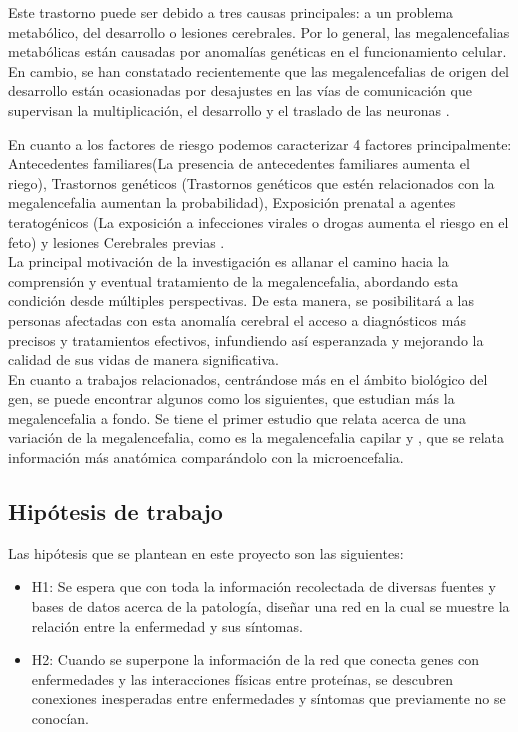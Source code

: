 Este trastorno puede ser debido a tres causas principales: a un problema metabólico, del desarrollo o lesiones cerebrales. Por lo general, las megalencefalias metabólicas están causadas por anomalías genéticas en el funcionamiento celular. En cambio, se han constatado recientemente que las megalencefalias de origen del desarrollo están ocasionadas por desajustes en las vías de comunicación que supervisan la multiplicación, el desarrollo y el traslado de las neuronas \cite{winden_megalencephaly_2015}.

En cuanto a los factores de riesgo podemos caracterizar 4 factores principalmente: Antecedentes familiares(La presencia de antecedentes familiares aumenta el riego), Trastornos genéticos (Trastornos genéticos que estén relacionados con la megalencefalia aumentan la probabilidad), Exposición prenatal a agentes teratogénicos (La exposición a infecciones virales o drogas aumenta el riesgo en el feto) y lesiones Cerebrales previas \cite{winden_megalencephaly_2015}. \\


La principal motivación de la investigación es allanar el camino hacia la comprensión y eventual tratamiento de la megalencefalia, abordando esta condición desde múltiples perspectivas. De esta manera, se posibilitará a las personas afectadas con esta anomalía cerebral el acceso a diagnósticos más precisos y tratamientos efectivos, infundiendo así esperanzada y mejorando la calidad de sus vidas de manera significativa.\\


En cuanto a trabajos relacionados, centrándose más en el ámbito biológico del gen, se puede encontrar algunos como los siguientes, que estudian más la megalencefalia a fondo. Se tiene el primer estudio que relata acerca de una variación de la megalencefalia, como es la megalencefalia capilar \cite{mirzaa_megalencephaly-capillary_2012} y \cite{pirozzi_microcephaly_2018}, que se relata información más anatómica comparándolo con la microencefalia. 


\subsection{Hipótesis de trabajo}

Las hipótesis que se plantean en este proyecto son las siguientes:  

\begin{itemize}
    \item H1: Se espera que con toda la información recolectada de diversas fuentes y bases de datos acerca de la patología, diseñar una red en la cual se muestre la relación entre la enfermedad y sus síntomas.

    \item H2: Cuando se superpone la información de la red que conecta genes con enfermedades y las interacciones físicas entre proteínas, se descubren conexiones inesperadas entre enfermedades y síntomas que previamente no se conocían.
    
\end{itemize}

